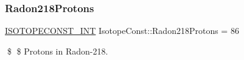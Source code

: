\subsubsection{\texorpdfstring{Radon218\+Protons}{Radon218Protons}}
{\footnotesize\ttfamily \mbox{\hyperlink{group___isotope_const-_macros_ga5f18360b3e99483a35c32d789e62621c}{I\+S\+O\+T\+O\+P\+E\+C\+O\+N\+S\+T\+\_\+\+I\+NT}} Isotope\+Const\+::\+Radon218\+Protons = 86}

\$ \$ Protons in Radon-\/218. 